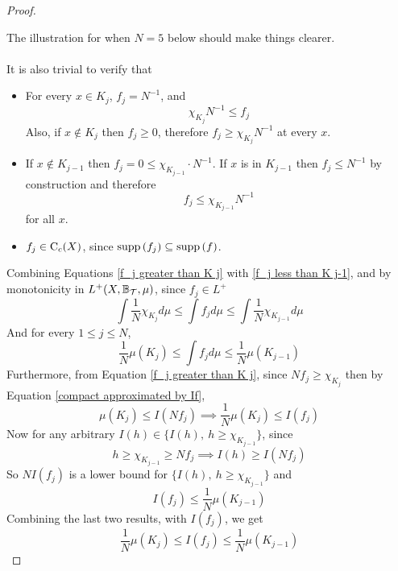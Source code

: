 \documentclass[../../main.tex]{subfiles}
\begin{document}
\begin{proof}
\begin{itemize}
    \end{itemize}
    The illustration for when $N=5$ below should make things clearer.\\
    \\ It is also trivial to verify that
    \begin{itemize}
        \item For every $x\in K_j$, $f_j=N^{-1}$, and
        \begin{equation}\label{f_j greater than K j}
        \chi_{K_{j}}N^{-1}\leq f_j
        \end{equation}
        Also, if $x\notin K_j$ then $f_j\geq 0$, therefore $f_j\geq \chi_{K_j}N^{-1}$ at every $x$.
        \item If $x\notin K_{j-1}$ then $f_j = 0\leq \chi_{K_{j-1}}\cdot N^{-1}$. If $x$ is in $K_{j-1}$ then $f_j\leq N^{-1}$ by construction and therefore
        \begin{equation}\label{f_j less than K j-1}
        f_j\leq \chi_{K_{j-1}}N^{-1}
        \end{equation}
        for all $x$.
        \item $f_j\in\operatorname{C}_c({X})$, since $\operatorname{supp}{(f_j)}\subseteq \operatorname{supp}{(f)}$.
    \end{itemize}
   Combining Equations \eqref{f_j greater than K j} with \eqref{f_j less than K j-1}, and by monotonicity in $L^+(X,\mathbb{B}_{\mathcal{T}},\mu)$, since $f_j\in L^+$
   \[
   \int \dfrac{1}{N}\chi_{K_j}d\mu\leq \int f_jd\mu\leq\int \dfrac{1}{N}\chi_{K_{j-1}}d\mu
   \]
   And for every $1\leq j\leq N$, 
   \begin{equation}\label{integral fj estimate}
   \frac{1}{N}\mu(K_j)\leq \int f_jd\mu\leq \frac{1}{N}\mu(K_{j-1})
   \end{equation}
   Furthermore, from Equation \eqref{f_j greater than K j}, since $Nf_j\geq \chi_{K_j}$ then by Equation \eqref{compact approximated by If},
    \[
    \mu(K_j)\leq I(N f_j)\implies\dfrac{1}{N}\mu(K_j)\leq I(f_j)
    \]
    Now for any arbitrary $I(h)\in\{I(h),\: h\geq \chi_{K_{j-1}}\}$, since
    \[
    h\geq\chi_{K_{j-1}}\geq N f_j\implies I(h)\geq I(N f_j)
    \]
    So $NI(f_j)$ is a lower bound for $\{I(h),\: h\geq \chi_{K_{j-1}}\}$ and 
    \[
    I(f_j)\leq\dfrac{1}{N}\mu(K_{j-1})
    \]
    Combining the last two results, with $I(f_j)$, we get
    \begin{equation}\label{I fj estimate}
    \dfrac{1}{N}\mu(K_j)\leq I(f_j)\leq\dfrac{1}{N}\mu(K_{j-1})    
    \end{equation}

\end{proof}
\end{document}
